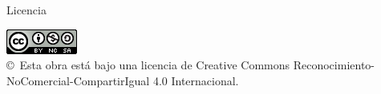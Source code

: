 \newpage

\begin{huge}
Licencia
\end{huge}

\begin{center}
\includegraphics[scale=1.5]{Imagenes/Licencias/by-nc-sa_88x31}\\[10mm]
{\Large \copyright~Esta obra está bajo una licencia de Creative Commons Reconocimiento-NoComercial-CompartirIgual 4.0 Internacional.
}
\end{center}
